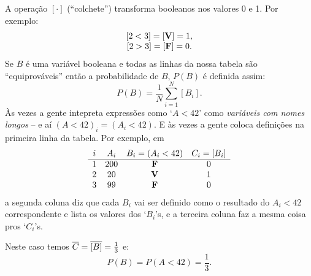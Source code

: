 \documentclass[oneside,12pt]{article}
\begin{document}
{{A operação $[·]$ (``colchete'') transforma boole\-anos nos valores 0 e
1. Por exemplo:
%
$$\begin{array}{c}
  [2<3] = [\mathbf{V}] = 1,   \\{}
  [2>3] = [\mathbf{F}] = 0.  \\
  \end{array}
$$
%
Se $B$ é uma variável booleana e todas as linhas da nossa tabela são
``equiprováveis'' então a probabilidade de $B$, $P(B)$ é definida
assim:
%
$$P(B) = \frac{1}{N} \sum_{i=1}^N [B_i].$$
%
Às vezes a gente intepreta expressões como `$A<42$' como {\sl
  variáveis com nomes longos} -- e aí $(A<42)_i = (A_i<42)$. E às
vezes a gente coloca definições na primeira linha da tabela. Por
exemplo, em
%
$$\begin{array}{cccc}
  i & A_i & B_i=(A_i<42) & C_i=[B_i] \\
  \hline
  1 & 200 & \mathbf{F} & 0 \\
  2 & 20  & \mathbf{V}  & 1 \\
  3 & 99  & \mathbf{F} & 0 \\
  \end{array}
$$
%
a segunda coluna diz que cada $B_i$ vai ser definido como o resultado
do $A_i<42$ correspondente e lista os valores dos `$B_i$'s, e a
terceira coluna faz a mesma coisa pros `$C_i$'s.

Neste caso temos $\overline{C} = \overline{[B]} = \frac13$ e:
%
$$P(B) = P(A<42) = \frac13.$$


}}
\end{document}
